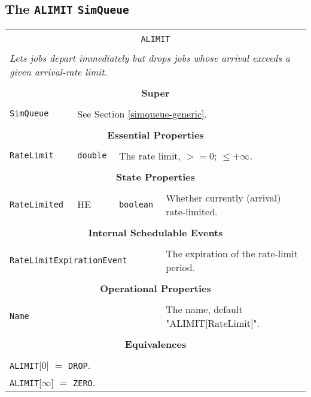 \documentclass[12pt]{book}
\begin{document}
\subsection{The \lstinline{ALIMIT} \lstinline{SimQueue}}

\begin{tabular}{|l|l|l|l|}
\hline
\multicolumn{4}{|c|}{} \\
\multicolumn{4}{|c|}{\lstinline[basicstyle=\large]{ALIMIT}} \\
\multicolumn{4}{|c|}{} \\
\hline
\multicolumn{4}{|l|}{\em Lets jobs depart immediately but drops jobs whose arrival exceeds a given arrival-rate limit.} \\
\hline
\multicolumn{4}{|c|}{} \\
\multicolumn{4}{|c|}{\bf Super} \\
\multicolumn{4}{|c|}{} \\
\hline
\lstinline|SimQueue| & \multicolumn{3}{|l|}{See Section \ref{simqueue-generic}.} \\
\hline
\multicolumn{4}{|c|}{} \\
\multicolumn{4}{|c|}{\bf Essential Properties} \\
\multicolumn{4}{|c|}{} \\
\hline
\lstinline|RateLimit| & \lstinline|double| & \multicolumn{2}{|l|}{The rate limit, $>= 0$; $\leq +\infty$.} \\
\hline
\multicolumn{4}{|c|}{} \\
\multicolumn{4}{|c|}{\bf State Properties} \\
\multicolumn{4}{|c|}{} \\
\hline
\lstinline|RateLimited| & HE & \lstinline|boolean| & Whether currently (arrival) rate-limited. \\
\hline
\multicolumn{4}{|c|}{} \\
\multicolumn{4}{|c|}{\bf Internal Schedulable Events} \\
\multicolumn{4}{|c|}{} \\
\hline
\multicolumn{3}{|l|}{\lstinline|RateLimitExpirationEvent|} & The expiration of the rate-limit period. \\
\hline
\multicolumn{4}{|c|}{} \\
\multicolumn{4}{|c|}{\bf Operational Properties} \\
\multicolumn{4}{|c|}{} \\
\hline
\multicolumn{3}{|l|}{\lstinline|Name|} & The name, default "ALIMIT[RateLimit]". \\
\hline
\multicolumn{4}{|c|}{} \\
\multicolumn{4}{|c|}{\bf Equivalences} \\
\multicolumn{4}{|c|}{} \\
\hline
\multicolumn{4}{|l|}{\lstinline|ALIMIT|[$0$] $=$ \lstinline|DROP|.} \\
\multicolumn{4}{|l|}{\lstinline|ALIMIT|[$\infty$] $=$ \lstinline|ZERO|.} \\
\hline
\end{tabular}
\end{document}
